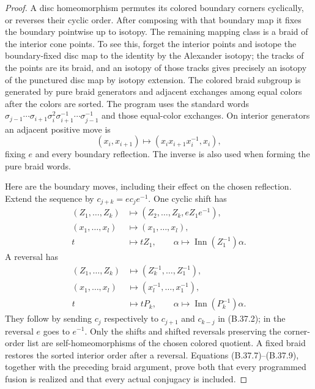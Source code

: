 \begin{proof}
A disc homeomorphism permutes its colored boundary corners cyclically,
or reverses their cyclic order.  After composing with that boundary
map it fixes the boundary pointwise up to isotopy.  The remaining
mapping class is a braid of the interior cone points.  To see this,
forget the interior points and isotope the boundary-fixed disc map
to the identity by the Alexander isotopy; the tracks of the points
are its braid, and an isotopy of those tracks gives precisely an
isotopy of the punctured disc map by isotopy extension.  The colored
braid subgroup is generated by pure braid generators and adjacent
exchanges among equal colors after the colors are sorted.  The
program uses the standard words
$\sigma_{j-1}\cdots\sigma_{i+1}\sigma_i^2
\sigma_{i+1}^{-1}\cdots\sigma_{j-1}^{-1}$ and those equal-color
exchanges.  On interior generators an adjacent positive move is
\[
                    (x_i,x_{i+1})\longmapsto
                    (x_ix_{i+1}x_i^{-1},x_i),           \tag{B.37.7}
\]
fixing $e$ and every boundary reflection.  The inverse is also used
when forming the pure braid words.

Here are the boundary moves, including their effect on the chosen
reflection.  Extend the sequence by $c_{j+k}=ec_je^{-1}$.  One cyclic
shift has
\[
 \begin{split}
 (Z_1,\ldots,Z_k)&\longmapsto
       (Z_2,\ldots,Z_k,eZ_1e^{-1}),\\
 (x_1,\ldots,x_l)&\longmapsto(x_1,\ldots,x_l),\\
 t&\longmapsto tZ_1,\qquad
 \alpha\longmapsto\operatorname{Inn}(Z_1^{-1})\alpha.
 \end{split}                                           \tag{B.37.8}
\]
A reversal has
\[
 \begin{split}
 (Z_1,\ldots,Z_k)&\longmapsto(Z_k^{-1},\ldots,Z_1^{-1}),\\
 (x_1,\ldots,x_l)&\longmapsto(x_l^{-1},\ldots,x_1^{-1}),\\
 t&\longmapsto tP_k,\qquad
 \alpha\longmapsto\operatorname{Inn}(P_k^{-1})\alpha.
 \end{split}                                           \tag{B.37.9}
\]
They follow by sending $c_j$ respectively to $c_{j+1}$ and
$c_{k-j}$ in (B.37.2); in the reversal $e$ goes to $e^{-1}$.
Only the shifts and shifted reversals preserving the corner-order
list are self-homeomorphisms of the chosen colored quotient.
A fixed braid restores the sorted interior order after a reversal.
Equations (B.37.7)--(B.37.9), together with the preceding braid
argument, prove both that every programmed fusion is realized and
that every actual conjugacy is included.


\end{proof}
